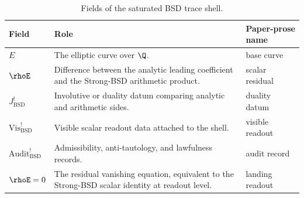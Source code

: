 \begin{table}[tbp]
\centering
\small
\caption{Fields of the saturated BSD trace shell.}
\label{tab:sel-bsd-shell-fields}
\begin{tabularx}{\textwidth}{@{}>{\raggedright\arraybackslash}p{}
>{\raggedright\arraybackslash}p{}
>{\raggedright\arraybackslash}X@{}}
\toprule
Field & Role & Paper-prose name \\
\midrule
\(E\) & The elliptic curve over \(\Q\). & base curve \\
\(\rhoE\) & Difference between the analytic leading coefficient and the
Strong-BSD arithmetic product. & scalar residual \\
\(J^{!}_{\mathrm{BSD}}\) & Involutive or duality datum comparing analytic and
arithmetic sides. & duality datum \\
\(\mathrm{Vis}^{!}_{\mathrm{BSD}}\) & Visible scalar readout data attached
to the shell. & visible readout \\
\(\mathrm{Audit}^{!}_{\mathrm{BSD}}\) & Admissibility, anti-tautology, and
lawfulness records. & audit record \\
\addlinespace
\(\rhoE=0\) & The residual vanishing equation, equivalent to the Strong-BSD
scalar identity at readout level. & landing readout \\
\bottomrule
\end{tabularx}
\end{table}
